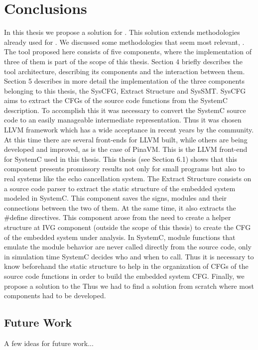 
\chapter{Conclusions}
\label{chapter:conclusions}

In this thesis we propose a solution for . This solution extends
methodologies already used for .
We discussed some methodologies that seem most relevant, .
The tool proposed here consists of five components, where the implementation of three of them is part of the scope of
this thesis. Section 4 briefly describes the tool architecture, describing its components and the interaction between
them. Section 5 describes in more detail the implementation of the three components belonging to this thesis, the
SysCFG, Extract Structure and SysSMT.
SysCFG aims to extract the CFGs of the source code functions from the SystemC description. To accomplish this it was
necessary to convert the SystemC source code to an easily manageable intermediate representation. Thus it was chosen
LLVM framework which has a wide acceptance in recent years by the community. At this time there are several front-ends
 for LLVM built, while others are being developed and improved, as is the case of PinaVM. This is the LLVM front-end
 for SystemC used in this thesis. This thesis (see Section 6.1) shows that this component presents promissory results
 not only for small programs but also to real systems like the echo cancellation system.
The Extract Structure consists on a source code parser to extract the static structure of the embedded system modeled
in SystemC. This component saves the signs, modules and their connections between the two of them. At the same time,
it also extracts the #define directives. This component arose from the need to create a helper structure at IVG component (outside the scope of this thesis) to create the CFG of the embedded system under analysis. In SystemC, module functions that emulate the module behavior are never called directly from the source code, only in simulation time SystemC decides who and when to call. Thus it is necessary to know beforehand the static structure to help in the organization of CFGs of the source code functions in order to build the embedded system CFG.
Finally, we propose a solution to the
 Thus we had to find a solution from scratch where most 
components had to be developed.


\section{Future Work}
\label{section:future}

A few ideas for future work...
